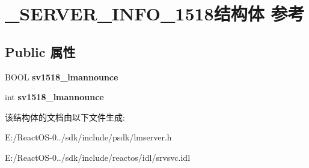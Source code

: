 \hypertarget{struct___s_e_r_v_e_r___i_n_f_o__1518}{}\section{\+\_\+\+S\+E\+R\+V\+E\+R\+\_\+\+I\+N\+F\+O\+\_\+1518结构体 参考}
\label{struct___s_e_r_v_e_r___i_n_f_o__1518}
\subsection*{Public 属性}
\begin{DoxyCompactItemize}
\item 
\mbox{\label{struct___s_e_r_v_e_r___i_n_f_o__1518_ae4041f97dac12b972b5ee2190179cee6}} 
B\+O\+OL {\bfseries sv1518\+\_\+lmannounce}
\item 
\mbox{\label{struct___s_e_r_v_e_r___i_n_f_o__1518_ae218867fb5bf03e6c5df6af381c4cf73}} 
int {\bfseries sv1518\+\_\+lmannounce}
\end{DoxyCompactItemize}


该结构体的文档由以下文件生成\+:\begin{DoxyCompactItemize}
\item 
E\+:/\+React\+O\+S-\/0../sdk/include/psdk/lmserver.\+h\item 
E\+:/\+React\+O\+S-\/0../sdk/include/reactos/idl/srvsvc.\+idl\end{DoxyCompactItemize}
